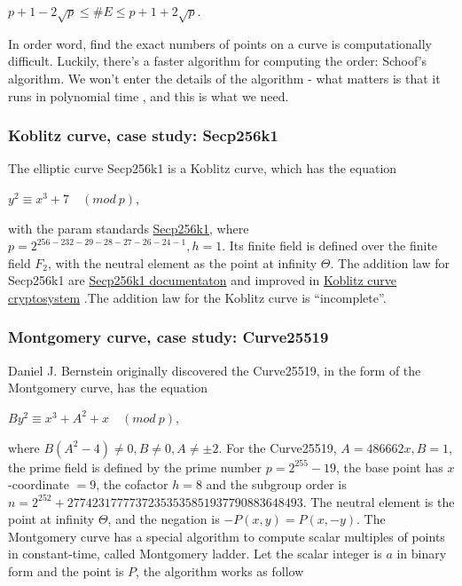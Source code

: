 \begin{center}
  $p+1-2\sqrt{p} \leq \#E \leq p+1+2\sqrt{p}$.
\end{center}

In order word, find the exact numbers of points on a curve is computationally difficult. Luckily, there's a faster algorithm for computing the order: Schoof's algorithm. We won't enter the details of the algorithm - what matters is that it runs in polynomial time \cite{Schoof}, and this is what we need.

\subsubsection{Koblitz curve, case study: Secp256k1}
The elliptic curve Secp256k1 is a Koblitz curve, which has the equation

\begin{center}
  $y^2 \equiv x^3 + 7 \quad (mod \ p)$,
\end{center}

with the param standards \href{https://en.bitcoin.it/wiki/Secp256k1}{Secp256k1}, where $p = 2^{256 - 232 - 29 - 28 - 27 - 26 - 24 - 1}, h = 1$. Its finite field is defined over the finite field $F_2$, with the neutral element as the point at infinity $\Theta$. The addition law for Secp256k1 are \href{https://www.researchgate.net/publication/332783847_Arithmetic_of_Koblitz_Curve_Secp256k1_Used_in_Bitcoin_Cryptocurrency_Based_on_One_Variable_Polynomial_Division}{Secp256k1 documentaton} and improved in \href{https://www.researchgate.net/publication/223346975_Koblitz_curve_cryptosystems}{Koblitz curve cryptosystem} .The addition law for the Koblitz curve is “incomplete”.

\subsubsection{Montgomery curve, case study: Curve25519}
Daniel J. Bernstein originally discovered the Curve25519, in the form of the Montgomery curve, has the equation

\begin{center}
  $By^2 \equiv x^3 + A^2 + x \quad (mod \ p)$,
\end{center}

where $B(A^2-4) \neq 0, B \neq 0, A \neq \pm 2$. For the Curve25519, $A = 486662x, B = 1$, the prime field is defined by the prime number $p=2^{255}-19$, the base point has $x$-coordinate $= 9$,  the cofactor $h = 8$ and the subgroup order is $n = 2^{252} + 27742317777372353535851937790883648493$. The neutral element is the point at infinity $\Theta$, and the negation is $-P(x, y) = P(x, -y)$. The Montgomery curve has a special algorithm to compute scalar multiples of points in constant-time, called Montgomery ladder. Let the scalar integer is $a$ in binary form and the point is $P$, the algorithm works as follow

